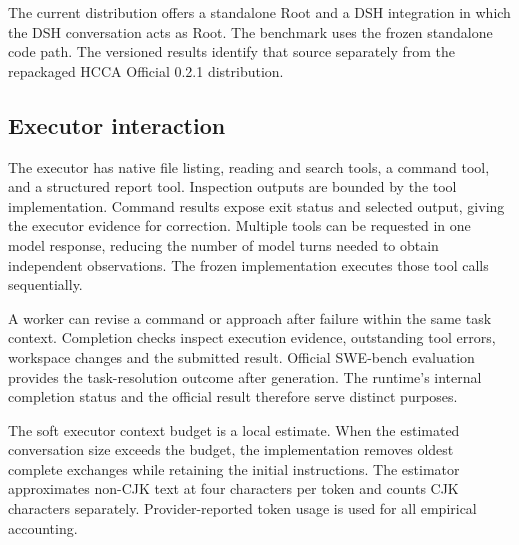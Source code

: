 \documentclass[10pt,a4paper]{article}
\begin{document}
The current distribution offers a standalone Root and a DSH integration in
which the DSH conversation acts as Root. The benchmark uses the frozen
standalone code path. The versioned results identify that source separately
from the repackaged HCCA Official 0.2.1 distribution.

\subsection{Executor interaction}

The executor has native file listing, reading and search tools, a command tool,
and a structured report tool. Inspection outputs are bounded by the tool
implementation. Command results expose exit status and selected output, giving
the executor evidence for correction. Multiple tools can be requested in one
model response, reducing the number of model turns needed to obtain independent
observations. The frozen implementation executes those tool calls sequentially.

A worker can revise a command or approach after failure within the same task
context. Completion checks inspect execution evidence, outstanding tool errors,
workspace changes and the submitted result. Official SWE-bench evaluation
provides the task-resolution outcome after generation. The runtime's internal
completion status and the official result therefore serve distinct purposes.

The soft executor context budget is a local estimate. When the estimated
conversation size exceeds the budget, the implementation removes oldest
complete exchanges while retaining the initial instructions. The estimator
approximates non-CJK text at four characters per token and counts CJK characters
separately. Provider-reported token usage is used for all empirical accounting.
\end{document}
